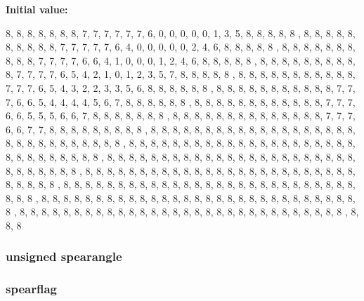 {\bfseries Initial value:}
\begin{DoxyCode}
 {
{ 8, 8, 8, 8, 8, 8, 8, 7, 7, 7, 7, 7, 7, 6, 0, 0, 0, 0, 0, 1, 3, 5, 8, 8, 8, 8, 8
      , 8, 8, 8},
{ 8, 8, 8, 8, 8, 8, 8, 7, 7, 7, 7, 7, 6, 4, 0, 0, 0, 0, 0, 2, 4, 6, 8, 8, 8, 8, 8
      , 8, 8, 8},
{ 8, 8, 8, 8, 8, 8, 8, 7, 7, 7, 7, 6, 6, 4, 1, 0, 0, 0, 1, 2, 4, 6, 8, 8, 8, 8, 8
      , 8, 8, 8},
{ 8, 8, 8, 8, 8, 8, 8, 7, 7, 7, 7, 6, 5, 4, 2, 1, 0, 1, 2, 3, 5, 7, 8, 8, 8, 8, 8
      , 8, 8, 8},
{ 8, 8, 8, 8, 8, 8, 8, 8, 7, 7, 7, 6, 5, 4, 3, 2, 2, 3, 3, 5, 6, 8, 8, 8, 8, 8, 8
      , 8, 8, 8},
{ 8, 8, 8, 8, 8, 8, 8, 8, 7, 7, 7, 6, 6, 5, 4, 4, 4, 4, 5, 6, 7, 8, 8, 8, 8, 8, 8
      , 8, 8, 8},
{ 8, 8, 8, 8, 8, 8, 8, 8, 8, 7, 7, 7, 6, 6, 5, 5, 5, 6, 6, 7, 8, 8, 8, 8, 8, 8, 8
      , 8, 8, 8},
{ 8, 8, 8, 8, 8, 8, 8, 8, 8, 8, 8, 7, 7, 7, 6, 6, 7, 7, 8, 8, 8, 8, 8, 8, 8, 8, 8
      , 8, 8, 8},
{ 8, 8, 8, 8, 8, 8, 8, 8, 8, 8, 8, 8, 8, 8, 8, 8, 8, 8, 8, 8, 8, 8, 8, 8, 8, 8, 8
      , 8, 8, 8},
{ 8, 8, 8, 8, 8, 8, 8, 8, 8, 8, 8, 8, 8, 8, 8, 8, 8, 8, 8, 8, 8, 8, 8, 8, 8, 8, 8
      , 8, 8, 8},
{ 8, 8, 8, 8, 8, 8, 8, 8, 8, 8, 8, 8, 8, 8, 8, 8, 8, 8, 8, 8, 8, 8, 8, 8, 8, 8, 8
      , 8, 8, 8},
{ 8, 8, 8, 8, 8, 8, 8, 8, 8, 8, 8, 8, 8, 8, 8, 8, 8, 8, 8, 8, 8, 8, 8, 8, 8, 8, 8
      , 8, 8, 8},
{ 8, 8, 8, 8, 8, 8, 8, 8, 8, 8, 8, 8, 8, 8, 8, 8, 8, 8, 8, 8, 8, 8, 8, 8, 8, 8, 8
      , 8, 8, 8},
{ 8, 8, 8, 8, 8, 8, 8, 8, 8, 8, 8, 8, 8, 8, 8, 8, 8, 8, 8, 8, 8, 8, 8, 8, 8, 8, 8
      , 8, 8, 8},
{ 8, 8, 8, 8, 8, 8, 8, 8, 8, 8, 8, 8, 8, 8, 8, 8, 8, 8, 8, 8, 8, 8, 8, 8, 8, 8, 8
      , 8, 8, 8}
}
\end{DoxyCode}
\hypertarget{WL__GAME_8C_aeabd6653f233001b4ab39e050f68e50a}{
\subsubsection[{spearangle}]{\setlength{\rightskip}{0pt plus 5cm}unsigned {\bf spearangle}}}
\label{WL__GAME_8C_aeabd6653f233001b4ab39e050f68e50a}
\hypertarget{WL__GAME_8C_acb0002722dd184f6c0ed9e21d9d4f4f2}{
\subsubsection[{spearflag}]{ {\bf spearflag}}}
\label{WL__GAME_8C_acb0002722dd184f6c0ed9e21d9d4f4f2}
